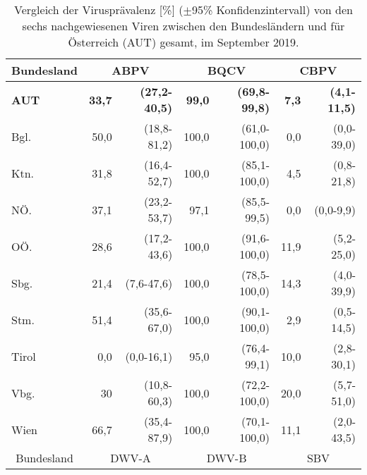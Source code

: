 \begin{table}[H]
    \caption{Vergleich der Virusprävalenz [\%] (\(\pm \)95\% Konfidenzintervall) von den sechs nachgewiesenen Viren zwischen den Bundesländern und für Österreich (AUT) gesamt, im September 2019.}
    \centering
    \footnotesize
    \label{tab:j:praevalenz_BL}
    \begin{tabular}{l|*{2}{rr|}rr}
        \toprule    
        \multicolumn{1}{c|}{Bundesland} & 
        \multicolumn{2}{c|}{ABPV}   & 
        \multicolumn{2}{c|}{BQCV}   & 
        \multicolumn{2}{c}{CBPV}   \\
        \midrule
        
	    \textbf{AUT} & \textbf{33,7} & \textbf{(27,2-40,5)} & \textbf{99,0} & \textbf{(69,8-99,8)} &  \textbf{7,3} &  \textbf{(4,1-11,5)} \\
        Bgl. & 50,0 & (18,8-81,2) & 100,0 & (61,0-100,0) &  0,0 & (0,0-39,0) \\
        Ktn. & 31,8 & (16,4-52,7) & 100,0 & (85,1-100,0) &  4,5 &  (0,8-21,8) \\
        NÖ. & 37,1 & (23,2-53,7) & 97,1 & (85,5-99,5) &  0,0 & (0,0-9,9)     \\
        OÖ. & 28,6 & (17,2-43,6) & 100,0 & (91,6-100,0) &  11,9 &  (5,2-25,0) \\
        Sbg. & 21,4 & (7,6-47,6) & 100,0 & (78,5-100,0) &  14,3 &  (4,0-39,9) \\
        Stm. & 51,4 & (35,6-67,0) & 100,0 & (90,1-100,0) &  2,9 &  (0,5-14,5) \\
        Tirol & 0,0 & (0,0-16,1) & 95,0 & (76,4-99,1) &  10,0 &  (2,8-30,1) \\
        Vbg. & 30 & (10,8-60,3) & 100,0 & (72,2-100,0) &  20,0 &  (5,7-51,0) \\
        Wien & 66,7 & (35,4-87,9) & 100,0 & (70,1-100,0) &  11,1 &  (2,0-43,5) \\

        \midrule    
        \multicolumn{1}{c|}{Bundesland} & 
        \multicolumn{2}{c|}{DWV-A}   & 
        \multicolumn{2}{c|}{DWV-B}   & 
        \multicolumn{2}{c}{SBV}   \\
        \midrule


\end{tabular}
\end{table}
